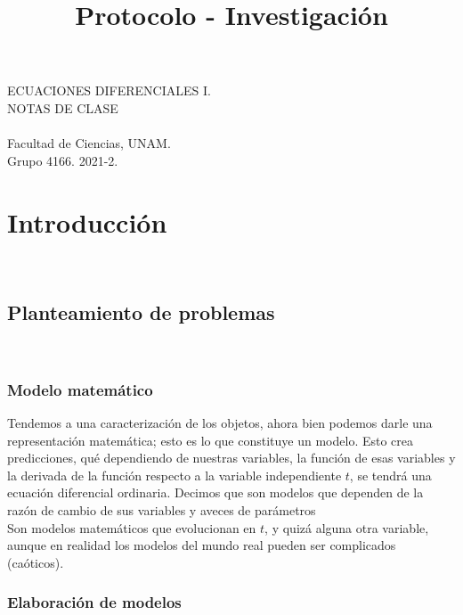 \documentclass[10pt,a4paper,notitlepage]{report}
\title{Protocolo - Investigación}
\begin{document}
\begin{center}

\Large ECUACIONES DIFERENCIALES I.  \vspace{0.2cm} \\
NOTAS DE CLASE \vspace{0.2cm} \\  \vspace{0.2cm} \\ Facultad de Ciencias, UNAM. 
\vspace{0.2cm} \\ Grupo 4166. 2021-2.

\end{center}
\Large 
\chapter{Introducción} \vspace{0.2cm} \\
\section{Planteamiento de problemas} \vspace{0.2cm}\\


\Large
\subsection{Modelo matemático}
Tendemos a una caracterización de los objetos, ahora bien podemos darle una representación matemática; esto es lo que constituye un modelo. Esto crea predicciones, qué dependiendo de nuestras variables, la función de esas variables y la derivada de la función respecto a la variable independiente $t$, se tendrá una ecuación diferencial ordinaria. Decimos que son modelos que dependen de la razón de cambio de sus variables y aveces de parámetros\\
Son modelos matemáticos que evolucionan en $t$, y quizá alguna otra variable, aunque en realidad los modelos del mundo real pueden ser complicados (caóticos).
\subsection*{Elaboración de modelos}
\end{document}
